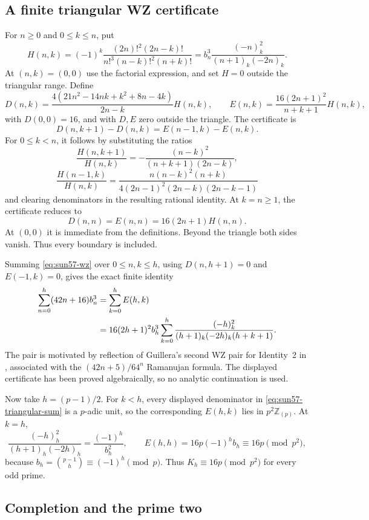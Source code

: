\documentclass[11pt,a4paper]{article}
\numberwithin{equation}{section}
\theoremstyle{remark}
\begin{document}
\subsection{A finite triangular WZ certificate}

For $n\ge0$ and $0\le k\le n$, put
\[
 H(n,k)=(-1)^k
 \frac{(2n)!^2(2n-k)!}{n!^3(n-k)!^2(n+k)!}
 =b_n^3\frac{(-n)_k^2}{(n+1)_k(-2n)_k}.
\]
At $(n,k)=(0,0)$ use the factorial expression, and set $H=0$
outside the triangular range. Define
\[
 D(n,k)=\frac{4(21n^2-14nk+k^2+8n-4k)}{2n-k}H(n,k),
 \qquad
 E(n,k)=\frac{16(2n+1)^2}{n+k+1}H(n,k),
\]
with $D(0,0)=16$, and with $D,E$ zero outside the triangle.
The certificate is
\begin{equation}\label{eq:sun57-wz}
 D(n,k+1)-D(n,k)=E(n-1,k)-E(n,k).
\end{equation}
For $0\le k<n$, it follows by substituting the ratios
\[
 \frac{H(n,k+1)}{H(n,k)}
 =-\frac{(n-k)^2}{(n+k+1)(2n-k)},
\]
\[
 \frac{H(n-1,k)}{H(n,k)}
 =\frac{n(n-k)^2(n+k)}
        {4(2n-1)^2(2n-k)(2n-k-1)}
\]
and clearing denominators in the resulting rational identity.
At $k=n\ge1$, the certificate reduces to
\[
 D(n,n)=E(n,n)=16(2n+1)H(n,n).
\]
At $(0,0)$ it is immediate from the definitions. Beyond the
triangle both sides vanish. Thus every boundary is included.

Summing \eqref{eq:sun57-wz} over $0\le n,k\le h$, using
$D(n,h+1)=0$ and $E(-1,k)=0$, gives the exact finite identity
\begin{align}
 \sum_{n=0}^h(42n+16)b_n^3
 &=\sum_{k=0}^h E(h,k)\notag\\
 &=16(2h+1)^2b_h^3
   \sum_{k=0}^h
   \frac{(-h)_k^2}{(h+1)_k(-2h)_k(h+k+1)}.
 \label{eq:sun57-triangular-sum}
\end{align}
The pair is motivated by reflection of Guillera's second WZ pair
for Identity~2 in \cite{Guillera2008}, associated with the
$(42n+5)/64^n$ Ramanujan formula. The displayed certificate has
been proved algebraically, so no analytic continuation is used.

Now take $h=(p-1)/2$. For $k<h$, every displayed denominator in
\eqref{eq:sun57-triangular-sum} is a $p$-adic unit, so the
corresponding $E(h,k)$ lies in $p^2\mathbb Z_{(p)}$. At $k=h$,
\[
 \frac{(-h)_h^2}{(h+1)_h(-2h)_h}
 =\frac{(-1)^h}{b_h^2},
 \qquad
 E(h,h)=16p(-1)^h b_h\equiv16p\pmod{p^2},
\]
because $b_h=\binom{p-1}h\equiv(-1)^h\pmod p$.
Thus $K_h\equiv16p\pmod{p^2}$ for every odd prime.

\subsection{Completion and the prime two}
\end{document}
